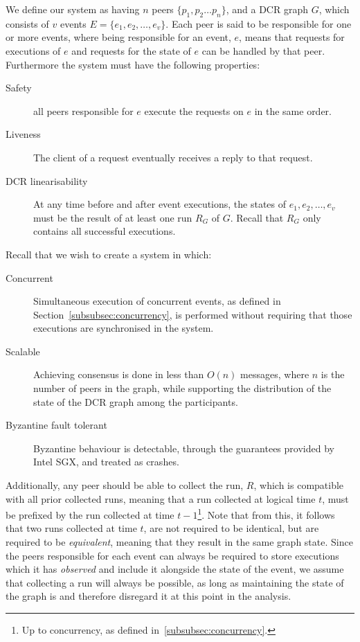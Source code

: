 \documentclass{article}
\begin{document}
	We define our system as having $n$ peers $\{p_1, p_2 \dots p_n\}$, and a DCR graph $G$, which consists of $v$ events $E = \{e_1, e_2, \dots, e_v\}$.
	Each peer is said to be responsible for one or more events, where being responsible for an event, $e$, means that requests for executions of $e$ and requests for the state of $e$ can be handled by that peer.
	Furthermore the system must have the following properties:
	\begin{description}
		\item[Safety] all peers responsible for $e$ execute the requests on $e$ in the same order.
		\item[Liveness] The client of a request eventually receives a reply to that request.
		\item[DCR linearisability] At any time before and after event executions, the states of $e_1, e_2, \dots, e_v$ must be the result of at least one run $R_G$ of $G$. Recall that $R_G$ only contains all successful executions.
	\end{description}

    Recall that we wish to create a system in which:
    \begin{description}
        \item[Concurrent] Simultaneous execution of concurrent events, as defined in Section~\ref{subsubsec:concurrency}, is performed without requiring that those executions are synchronised in the system.
        \item[Scalable] Achieving consensus is done in less than $O(n)$ messages, where $n$ is the number of peers in the graph, while supporting the distribution of the state of the DCR graph among the participants.
        \item[Byzantine fault tolerant] Byzantine behaviour is detectable, through the guarantees provided by Intel SGX, and treated as crashes.
    \end{description}

	 Additionally, any peer should be able to collect the run, $R$, which is compatible with all prior collected runs, meaning that a run collected at logical time $t$, must be prefixed by the run collected at time $t-1$\footnote{Up to concurrency, as defined in~\ref{subsubsec:concurrency}.}.
     Note that from this, it follows that two runs collected at time $t$, are not required to be identical, but are required to be \textit{equivalent}, meaning that they result in the same graph state.
     Since the peers responsible for each event can always be required to store executions which it has \textit{observed} and include it alongside the state of the event, we assume that collecting a run will always be possible, as long as maintaining the state of the graph is and therefore disregard it at this point in the analysis.
\end{document}
